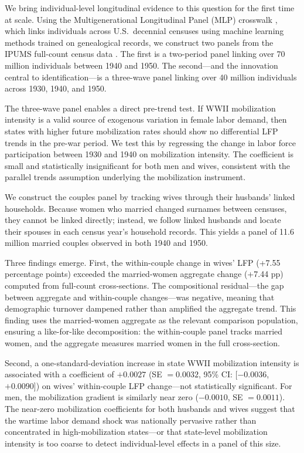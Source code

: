 \documentclass[12pt]{article}
\begin{document}
We bring individual-level longitudinal evidence to this question for the first time at scale. Using the Multigenerational Longitudinal Panel (MLP) crosswalk \citep{helgertz2023mlp}, which links individuals across U.S.\ decennial censuses using machine learning methods trained on genealogical records, we construct two panels from the IPUMS full-count census data \citep{ruggles2024ipums}. The first is a two-period panel linking over 70 million individuals between 1940 and 1950. The second---and the innovation central to identification---is a three-wave panel linking over 40 million individuals across 1930, 1940, and 1950.

The three-wave panel enables a direct pre-trend test. If WWII mobilization intensity is a valid source of exogenous variation in female labor demand, then states with higher future mobilization rates should show no differential LFP trends in the pre-war period. We test this by regressing the change in labor force participation between 1930 and 1940 on mobilization intensity. The coefficient is small and statistically insignificant for both men and wives, consistent with the parallel trends assumption underlying the mobilization instrument.

We construct the couples panel by tracking wives through their husbands' linked households. Because women who married changed surnames between censuses, they cannot be linked directly; instead, we follow linked husbands and locate their spouses in each census year's household records. This yields a panel of 11.6 million married couples observed in both 1940 and 1950.

Three findings emerge. First, the within-couple change in wives' LFP (+7.55 percentage points) exceeded the married-women aggregate change (+7.44 pp) computed from full-count cross-sections. The compositional residual---the gap between aggregate and within-couple changes---was negative, meaning that demographic turnover dampened rather than amplified the aggregate trend. This finding uses the married-women aggregate as the relevant comparison population, ensuring a like-for-like decomposition: the within-couple panel tracks married women, and the aggregate measures married women in the full cross-section.

Second, a one-standard-deviation increase in state WWII mobilization intensity is associated with a coefficient of $+0.0027$ (SE $= 0.0032$, 95\% CI: [$-0.0036$, $+0.0090$]) on wives' within-couple LFP change---not statistically significant. For men, the mobilization gradient is similarly near zero ($-0.0010$, SE $= 0.0011$). The near-zero mobilization coefficients for both husbands and wives suggest that the wartime labor demand shock was nationally pervasive rather than concentrated in high-mobilization states---or that state-level mobilization intensity is too coarse to detect individual-level effects in a panel of this size.
\end{document}

